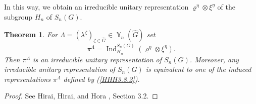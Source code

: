 \documentclass[12pt]{amsart}
\newtheorem{thm}{Theorem}[section]
\theoremstyle{definition}
\numberwithin{equation}{section}
\DeclareMathOperator{\Ind}{Ind}
\DeclareMathOperator{\Y}{\mathbb{Y}}
\begin{document}
In this way, we obtain an irreducible unitary representation $\varrho^{\eta}\otimes\xi^{\eta}$ of the subgroup $H_n$ of $S_n(G)$.
\begin{thm}\label{TheoremHHH3.8.1}
For $\Lambda=\left(\lambda^{\zeta}\right)_{\zeta\in\widehat{G}}\in\Y_n\left(\widehat{G}\right)$ set
\begin{equation}\label{HHH3.8.2}
\pi^{\Lambda}=\Ind_{H_n}^{S_n(G)}\left(\varrho^{\eta}\otimes\xi^{\eta}\right).
\end{equation}
Then $\pi^{\Lambda}$ is an irreducible unitary representation of $S_n(G)$.
Moreover, any irreducible unitary representation of $S_n(G)$ is equivalent to one of the induced representations $\pi^{\Lambda}$ defined by (\ref{HHH3.8.2}).
\end{thm}
\begin{proof}See Hirai, Hirai, and Hora \cite{HiraiHiraiHoraI}, Section 3.2.
\end{proof}
\end{document}
